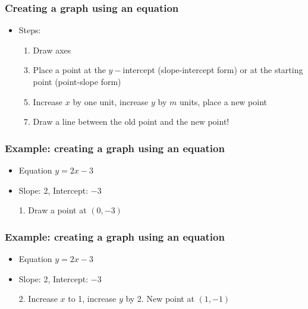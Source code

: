 \documentclass[11pt]{beamer}
\newcommand{\myframe}[1]{\begin{frame} \frametitle{#1}}
\begin{document}
\myframe{Creating a graph using an equation}
\begin{itemize}
\item Steps:
\begin{enumerate}
\item Draw axes
\item[]
\item Place a point at the $y-$intercept (slope-intercept form) or at the starting point (point-slope form)
\item[]
\item Increase $x$ by one unit, increase $y$ by $m$ units, place a new point
\item[]
\item Draw a line between the old point and the new point!
\end{enumerate}
\end{itemize}
\end{frame}

\myframe{Example: creating a graph using an equation}
\centering
\begin{itemize}
\item Equation $y = 2x - 3$
\item[]
\item Slope: 2, Intercept: $-3$
\item[]
\item[1.] Draw a point at $(0, -3)$
\end{itemize}
\end{frame}

\myframe{Example: creating a graph using an equation}
\centering
\begin{itemize}
\item Equation $y = 2x - 3$
\item[]
\item Slope: 2, Intercept: $-3$
\item[]
\item[2.] Increase $x$ to 1, increase $y$ by 2. New point at $(1, -1)$
\end{itemize}
\end{frame}
\end{document}
